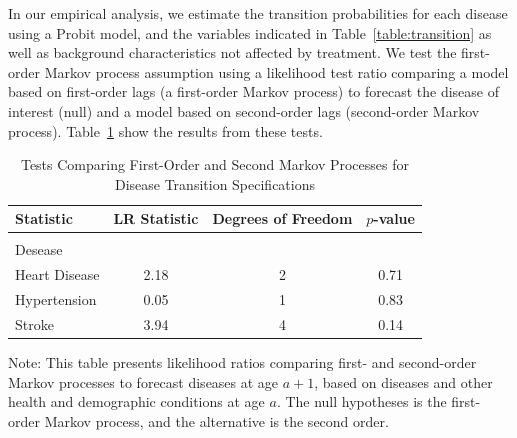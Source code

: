 \noindent In our empirical analysis, we estimate the transition probabilities for each disease using a Probit model, and the variables indicated in Table~\ref{table:transition} as well as background characteristics not affected by treatment. We test the first-order Markov process assumption using a likelihood test ratio comparing a model based on first-order lags (a first-order Markov process) to forecast the disease of interest (null) and a model based on second-order lags (second-order Markov process). Table~\ref{table:lrtests} show the results from these tests. \\

\begin{table}[H]
\begin{threeparttable}
\caption{Tests Comparing First-Order and Second Markov Processes for Disease Transition Specifications} \label{table:lrtests}
\centering
\footnotesize
\begin{tabular}{lccc}
\toprule
Statistic & LR Statistic & Degrees of Freedom & $p$-value \\
\midrule \\
Desease & \\
Heart Disease & 2.18 & 2 & 0.71 \\
Hypertension   & 0.05 & 1 & 0.83 \\
Stroke              & 3.94 & 4 & 0.14 \\
\bottomrule
\end{tabular}
\begin{tablenotes}
\footnotesize
\item Note: This table presents likelihood ratios comparing first- and second-order Markov processes to forecast diseases at age $a+1$, based on diseases and other health and demographic conditions at age $a$. The null hypotheses is the first-order Markov process, and the alternative is the second order.
\end{tablenotes}
\end{threeparttable}
\end{table}

